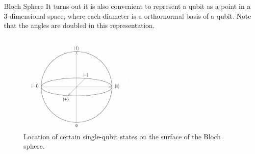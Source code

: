 \documentclass[10pt]{beamer}
\begin{document}
\begin{frame}[fragile]{Bloch Sphere} 
    It turns out it is also convenient to represent a qubit as a point in a 3 dimensional space, where each diameter is a orthornormal basis of a qubit. Note that the angles are doubled in this representation.
        \begin{figure}[htbp]
          \centering
          \includegraphics[width=0.5\textwidth]{bloch.png}
          \caption{Location of certain single-qubit states on the surface of the Bloch sphere.}
    \end{figure}
\end{frame}
\end{document}
